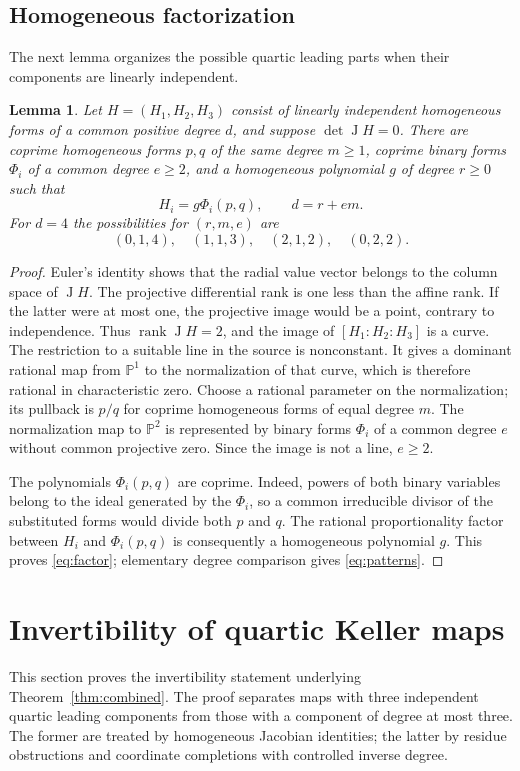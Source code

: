 \documentclass[11pt,reqno]{amsart}
\numberwithin{equation}{section}
\theoremstyle{plain}
\newtheorem{lemma}[theorem]{Lemma}
\theoremstyle{definition}
\theoremstyle{remark}
\newcommand{\PP}{\mathbb P}
\newcommand{\rank}{\operatorname{rank}}
\newcommand{\J}{\operatorname J}
\begin{document}
\subsection{Homogeneous factorization}
The next lemma organizes the possible quartic leading parts when their
components are linearly independent.
\begin{lemma}\label{lem:factor}
Let $H=(H_1,H_2,H_3)$ consist of linearly independent homogeneous forms of a common positive degree $d$, and suppose $\det\J H=0$. There are coprime homogeneous forms $p,q$ of the same degree $m\ge1$, coprime binary forms $\Phi_i$ of a common degree $e\ge2$, and a homogeneous polynomial $g$ of degree $r\ge0$ such that
\begin{equation}\label{eq:factor}
H_i=g\Phi_i(p,q),\qquad d=r+em.
\end{equation}
For $d=4$ the possibilities for $(r,m,e)$ are
\begin{equation}\label{eq:patterns}
(0,1,4),\quad(1,1,3),\quad(2,1,2),\quad(0,2,2).
\end{equation}
\end{lemma}
\begin{proof}
Euler's identity shows that the radial value vector belongs to the column space of $\J H$. The projective differential rank is one less than the affine rank. If the latter were at most one, the projective image would be a point, contrary to independence. Thus $\rank\J H=2$, and the image of $[H_1:H_2:H_3]$ is a curve.
The restriction to a suitable line in the source is nonconstant. It gives a dominant rational map from $\PP^1$ to the normalization of that curve, which is therefore rational in characteristic zero. Choose a rational parameter on the normalization; its pullback is $p/q$ for coprime homogeneous forms of equal degree $m$. The normalization map to $\PP^2$ is represented by binary forms $\Phi_i$ of a common degree $e$ without common projective zero. Since the image is not a line, $e\ge2$.

The polynomials $\Phi_i(p,q)$ are coprime. Indeed, powers of both binary variables belong to the ideal generated by the $\Phi_i$, so a common irreducible divisor of the substituted forms would divide both $p$ and $q$. The rational proportionality factor between $H_i$ and $\Phi_i(p,q)$
is consequently a homogeneous polynomial $g$. This proves \eqref{eq:factor}; elementary degree comparison gives \eqref{eq:patterns}.
\end{proof}

\section{Invertibility of quartic Keller maps}\label{sec:invertibility}
This section proves the invertibility statement underlying
Theorem~\ref{thm:combined}. The proof separates maps with three independent
quartic leading components from those with a component of degree at most
three. The former are treated by homogeneous Jacobian identities; the
latter by residue obstructions and coordinate completions with controlled
inverse degree.
\end{document}
